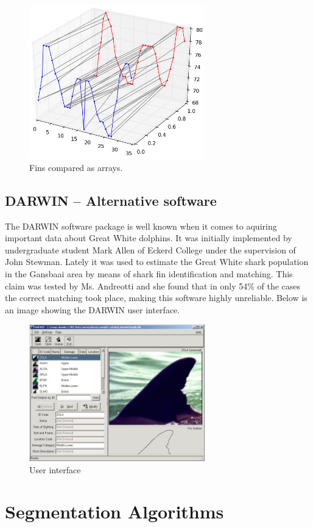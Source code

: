 \documentclass[a4paper,10pt]{article}
\begin{document}
\begin{figure}[H]
 \centering
 \includegraphics[width=3in]{dtw.jpg}
 \caption{Fins compared as arrays.}
 \label{dtw}
\end{figure}

\subsection{DARWIN -- Alternative software}
The DARWIN\cite{Darwin} software package is well known when it comes to aquiring important data about Great White dolphins.  It was initially implemented by undergraduate 
student Mark Allen of Eckerd College under the supervision of John Stewman.  Lately it was used to estimate the Great White
shark population in the Gansbaai area by means of shark fin identification and matching.  This claim was tested by Ms. Andreotti and she found that in only
54\% of the cases the correct matching took place, making this software highly
unreliable.  Below is an image showing the DARWIN user interface. 

\begin{figure}[H]
 \centering
 \includegraphics[width=3in]{Darwin.jpg}
 \caption{User interface}
\end{figure}

\section{Segmentation Algorithms}
\end{document}
